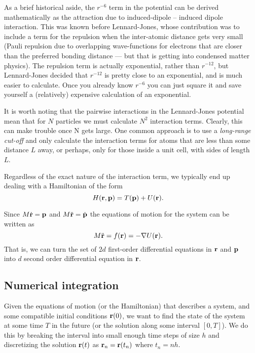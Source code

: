 \documentclass{article}
\begin{document}
As a brief historical aside, the $r^{-6}$ term in the potential can be derived mathematically as the attraction due to induced-dipole -- induced dipole interaction. This was known before Lennard-Jones, whose contribution was to include a term for the repulsion when the inter-atomic distance gets very small (Pauli repulsion due to overlapping wave-functions for electrons that are closer than the preferred bonding distance --- but that is getting into condensed matter physics). The repulsion term is actually exponential, rather than $r^{-12}$, but Lennard-Jones decided that $r^{-12}$ is pretty close to an exponential, and is much easier to calculate. Once you already know $r^{-6}$ you can just square it and save yourself a (relatively) expensive calculation of an exponential.

It is worth noting that the pairwise interactions in the Lennard-Jones potential mean that for $N$ particles we must calculate $N^2$ interaction terms. Clearly, this can make trouble once N gets large. One common approach is to use a \emph{long-range cut-off} and only calculate the interaction terms for atoms that are less than some distance $L$ away, or perhaps, only for those inside a unit cell, with sides of length $L$.

Regardless of the exact nature of the interaction term, we typically end up dealing with a Hamiltonian of the form 
$$
	H({\bf r},{\bf p}) = T({\bf p}) + U({\bf r}).
$$

Since $M\dot{\bf r} = {\bf p}$ and $M\ddot{\bf r} = \dot{\bf p}$ the equations of motion for the system can be written as
\begin{equation}
	M\ddot{\bf r} = f({\bf r}) = -\nabla U({\bf r}).
	\label{eq:2vf}
\end{equation}
That is, we can turn the set of $2d$ first-order differential equations in ${\bf r}$ and ${\bf p}$ into $d$ second order differential equation in ${\bf r}$.

\subsection*{Numerical integration}
Given the equations of motion (or the Hamiltonian) that describes a system, and some compatible initial conditions ${\bf r}(0)$, we want to find the state of the system at some time $T$ in the future (or the solution along some interval $[0,T]$). We do this by breaking the interval into small enough time steps of size $h$ and discretizing the solution ${\bf r}(t)$ as ${\bf r}_n = {\bf r}(t_n) $ where $t_n = nh$.
\end{document}
